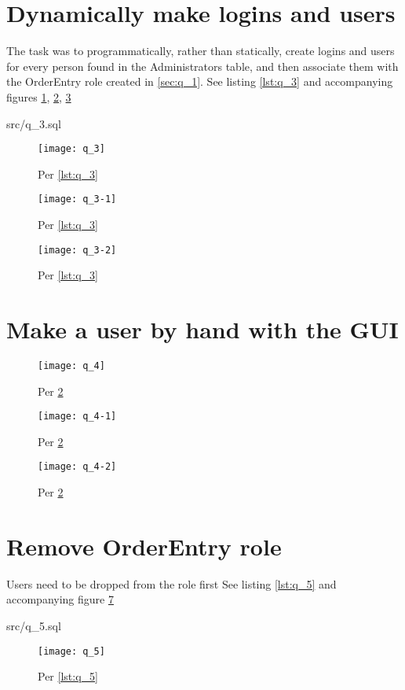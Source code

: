 \documentclass{article}
\begin{document}
\section{Dynamically make logins and users}
The task was to programmatically, rather than statically, create logins
and users for every person found in the Administrators table, and then
associate them with the OrderEntry role created in \ref{sec:q_1}.
See listing \ref{lst:q_3} and accompanying figures \ref{fig:q_3}, \ref{fig:q_3-1}, \ref{fig:q_3-2}
\label{sec:q_3}
\begin{lstinputlisting}[label={lst:q_3}, caption={Per
	\ref{sec:q_3}}]{src/q_3.sql}
\end{lstinputlisting}
\begin{figure}[H]\centering
	\caption{Per \ref{lst:q_3}}
	\texttt{[image: q\_3]}
	\label{fig:q_3}
\end{figure}

\begin{figure}[H]\centering
	\caption{Per \ref{lst:q_3}}
	\texttt{[image: q\_3-1]}
	\label{fig:q_3-1}
\end{figure}

\begin{figure}[H]\centering
	\caption{Per \ref{lst:q_3}}
	\texttt{[image: q\_3-2]}
	\label{fig:q_3-2}
\end{figure}

\section{Make a user by hand with the GUI}
\label{sec:q_4}
\begin{figure}[H]\centering
	\caption{Per \ref{sec:q_4}}
	\texttt{[image: q\_4]}
	\label{fig:q_4}
\end{figure}
\begin{figure}[H]\centering
	\caption{Per \ref{sec:q_4}}
	\texttt{[image: q\_4-1]}
	\label{fig:q_4-1}
\end{figure}
\begin{figure}[H]\centering
	\caption{Per \ref{sec:q_4}}
	\texttt{[image: q\_4-2]} \label{fig:q_4-2}
\end{figure}

\section{Remove OrderEntry role}
Users need to be dropped from the role first
See listing \ref{lst:q_5} and accompanying figure \ref{fig:q_5}
\label{sec:q_5}
\begin{lstinputlisting}[label={lst:q_5}, caption={Per
	\ref{sec:q_5}}]{src/q_5.sql}
\end{lstinputlisting}
\begin{figure}[H]\centering
	\caption{Per \ref{lst:q_5}}
	\texttt{[image: q\_5]}
	\label{fig:q_5}
\end{figure}
\end{document}
